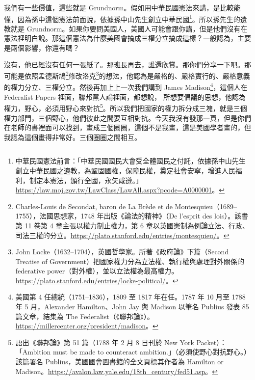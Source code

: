 \hypertarget{w05:cue:10}{}我們有一些價值，這些就是 Grundnorm。假如用中華民國憲法來講，是比較能懂，因為孫中這個憲法前面說，依據孫中山先生創立中華民國\footnote{中華民國憲法前言：「中華民國國民大會受全體國民之付託，依據孫中山先生創立中華民國之遺教，為鞏固國權，保障民權，奠定社會安寧，增進人民福利，制定本憲法，頒行全國，永矢咸遵。」\url{https://law.moj.gov.tw/LawClass/LawAll.aspx?pcode=A0000001}。}。所以孫先生的遺教就是 Grundnorm。如果你要問美國人，美國人可能會跟你講，但是他們沒有在憲法裡明白說。那這個憲法為什麼美國會搞成三權分立搞成這樣？一般認為，主要是兩個影響，你還有嗎？

\hypertarget{w05:cue:11}{}沒有，他已經沒有任何一張紙了。那班長再去，誰還欣賞。那你們分享一下吧。那可能是依照孟德斯鳩\footnote{Charles-Louis de Secondat, baron de La Brède et de Montesquieu（1689–1755），法國思想家，1748 年出版《論法的精神》（De l'esprit des lois）。該書第 11 卷第 4 章主張以權力制止權力，第 6 章以英國憲制為例論立法、行政、司法三權的分立。\url{https://plato.stanford.edu/entries/montesquieu/}。}修改洛克\footnote{John Locke（1632–1704），英國哲學家。所著《政府論》下篇（Second Treatise of Government）把國家權力分為立法權、執行權與處理對外關係的 federative power（對外權），並以立法權為最高權力。\url{https://plato.stanford.edu/entries/locke-political/}。}的想法，他認為是嚴格的、嚴格實行的、嚴格意義的權力分立、三權分立。然後再加上上一次我們講到 James Madison\footnote{美國第 4 任總統（1751–1836），1809 至 1817 年在任。1787 年 10 月至 1788 年 5 月，Alexander Hamilton、John Jay 與 Madison 以筆名 Publius 發表 85 篇文章，結集為 The Federalist（《聯邦論》）。\url{https://millercenter.org/president/madison}。}，這個人在 Federalist Papers 裡面，聯邦黨人論裡面，都想說，
\hypertarget{w05:cue:12}{}所想要倡議的思想，他認為權力，野心，必須用野心來對抗\footnote{語出《聯邦論》第 51 篇（1788 年 2 月 8 日刊於 New York Packet）：「Ambition must be made to counteract ambition.」（必須使野心對抗野心。）該篇署名 Publius，美國國會圖書館的全文頁標其作者為 Hamilton or Madison。\url{https://avalon.law.yale.edu/18th_century/fed51.asp}。}。所以我們把國家的權力拆分成三塊，就是三個權力部門，三個野心，他們彼此之間要互相對抗。今天我沒有發那一頁，但是你們在老師的書裡面可以找到，畫成三個圈圈，這個不是我畫，這是美國學者畫的，但我認為這個畫得非常好。三個圈圈之間相互。

